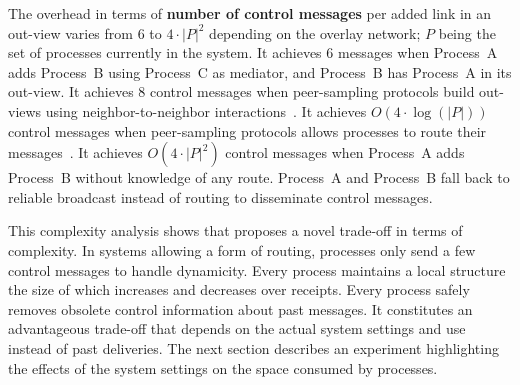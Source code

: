 \noindent The overhead in terms of \textbf{number of control messages} per added
link in an out-view varies from $6$ to $4 \cdot |P|^2$ depending on the overlay
network; $P$ being the set of processes currently in the system. It achieves $6$
messages when Process~A adds Process~B using Process~C as mediator, and
Process~B has Process~A in its out-view.  It achieves $8$ control messages when
peer-sampling protocols build out-views using neighbor-to-neighbor
interactions~\cite{jelasity2007gossip,nedelec2017adaptive}. It achieves
$O(4 \cdot \log(|P|))$ control messages when peer-sampling protocols allows
processes to route their messages~\cite{jelasity2009tman,stoica2001chord}.  It
achieves $O(4 \cdot |P|^2)$ control messages when Process~A adds Process~B
without knowledge of any route. Process~A and Process~B fall back to reliable
broadcast instead of routing to disseminate control messages.

This complexity analysis shows that \RPCBROADCAST proposes a novel trade-off in
terms of complexity. In systems allowing a form of routing, processes only send
a few control messages to handle dynamicity. Every process maintains a local
structure the size of which increases and decreases over receipts. Every process
safely removes obsolete control information about past messages. It constitutes
an advantageous trade-off that depends on the actual system settings and use
instead of past deliveries. The next section describes an experiment
highlighting the effects of the system settings on the space consumed by
processes.

